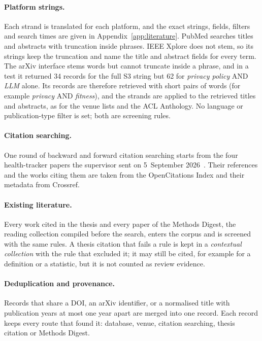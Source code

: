 \paragraph{Platform strings.} Each strand is translated for each platform, and
the exact strings, fields, filters and search times are given in
Appendix~\ref{app:literature}. PubMed searches titles and abstracts with
truncation inside phrases. IEEE Xplore does not stem, so its strings keep the
truncation and name the title and abstract fields for every term. The arXiv
interface stems words but cannot truncate inside a phrase, and in a test it
returned 34 records for the full S3 string but 62 for \emph{privacy policy} AND
\emph{LLM} alone. Its records are therefore retrieved with short pairs of words
(for example \emph{privacy} AND \emph{fitness}), and the strands are applied to
the retrieved titles and abstracts, as for the venue lists and the ACL
Anthology. No language or publication-type filter is set; both are screening
rules.

\paragraph{Citation searching.} One round of backward and forward citation
searching starts from the four health-tracker papers the supervisor sent on
5~September 2026~\parencite{malki2024exploring,hudig2025intimate,cao2024deleted,niksirat2024wearable}.
Their references and the works citing them are taken from the OpenCitations
Index and their metadata from Crossref.

\paragraph{Existing literature.} Every work cited in the thesis and every paper
of the Methods Digest, the reading collection compiled before the search,
enters the corpus and is screened with the same rules. A thesis citation that
fails a rule is kept in a \emph{contextual collection} with the rule that
excluded it; it may still be cited, for example for a definition or a
statistic, but it is not counted as review evidence.

\paragraph{Deduplication and provenance.} Records that share a DOI, an arXiv
identifier, or a normalised title with publication years at most one year
apart are merged into one record. Each record keeps every route that found it:
database, venue, citation searching, thesis citation or Methods Digest.


